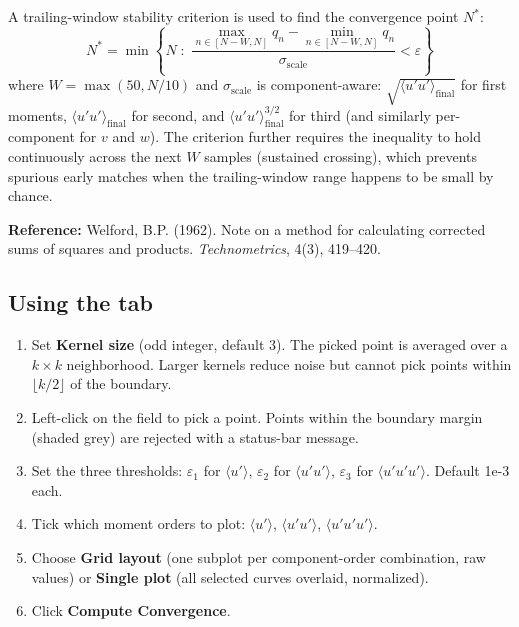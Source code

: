 \documentclass[11pt, a4paper]{report}
\newcommand{\uipth}[1]{\textbf{\textcolor{upblue}{#1}}}
\begin{document}
A trailing-window stability criterion is used to find the convergence point $N^*$:
\[
N^* = \min\left\{ N \;:\; \frac{\max_{n \in [N - W, N]} q_n - \min_{n \in [N - W, N]} q_n}{\sigma_{\mathrm{scale}}} < \varepsilon \right\}
\]
where $W = \max(50, N/10)$ and $\sigma_{\mathrm{scale}}$ is component-aware: $\sqrt{\langle u'u'\rangle_{\mathrm{final}}}$ for first moments, $\langle u'u'\rangle_{\mathrm{final}}$ for second, and $\langle u'u'\rangle_{\mathrm{final}}^{3/2}$ for third (and similarly per-component for $v$ and $w$). The criterion further requires the inequality to hold continuously across the next $W$ samples (sustained crossing), which prevents spurious early matches when the trailing-window range happens to be small by chance.

\noindent\textbf{Reference:} Welford, B.P. (1962). Note on a method for calculating corrected sums of squares and products. \textit{Technometrics}, 4(3), 419--420.

\subsection{Using the tab}

\begin{stepbox}
\begin{enumerate}[leftmargin=1.5em, topsep=2pt]
  \item Set \uipth{Kernel size} (odd integer, default 3). The picked point is averaged over a $k \times k$ neighborhood. Larger kernels reduce noise but cannot pick points within $\lfloor k/2 \rfloor$ of the boundary.
  \item Left-click on the field to pick a point. Points within the boundary margin (shaded grey) are rejected with a status-bar message.
  \item Set the three thresholds: $\varepsilon_1$ for $\langle u' \rangle$, $\varepsilon_2$ for $\langle u'u' \rangle$, $\varepsilon_3$ for $\langle u'u'u' \rangle$. Default 1e-3 each.
  \item Tick which moment orders to plot: $\langle u' \rangle$, $\langle u'u' \rangle$, $\langle u'u'u' \rangle$.
  \item Choose \uipth{Grid layout} (one subplot per component-order combination, raw values) or \uipth{Single plot} (all selected curves overlaid, normalized).
  \item Click \uipth{Compute Convergence}.
\end{enumerate}
\end{stepbox}
\end{document}
